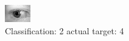 \begin{figure}[h!]
\begin{center}
\includegraphics[width=0.60\columnwidth]{figures/ID802_class_2_target_4.png}
\end{center}
\caption{ Classification: 2 actual target: 4}
\label{fig:ID802_class_2_target_4}
\end{figure}
